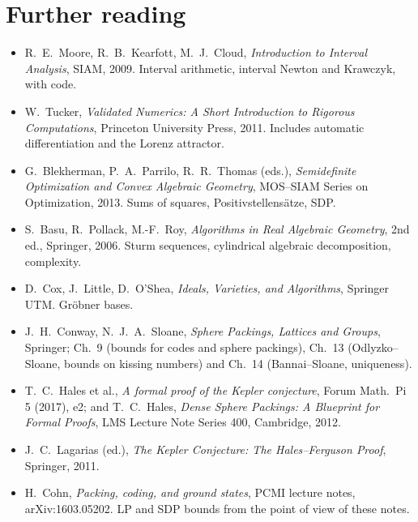 \documentclass[11pt,openany]{book}
\theoremstyle{plain}
\theoremstyle{definition}
\theoremstyle{remark}
\begin{document}
\section*{Further reading}
\begin{itemize}[nosep]
\item R.~E.~Moore, R.~B.~Kearfott, M.~J.~Cloud, \emph{Introduction to Interval Analysis}, SIAM, 2009. Interval
  arithmetic, interval Newton and Krawczyk, with code.
\item W.~Tucker, \emph{Validated Numerics: A Short Introduction to Rigorous Computations}, Princeton University
  Press, 2011. Includes automatic differentiation and the Lorenz attractor.
\item G.~Blekherman, P.~A.~Parrilo, R.~R.~Thomas (eds.), \emph{Semidefinite Optimization and Convex Algebraic
  Geometry}, MOS--SIAM Series on Optimization, 2013. Sums of squares, Positivstellens\"atze, SDP.
\item S.~Basu, R.~Pollack, M.-F.~Roy, \emph{Algorithms in Real Algebraic Geometry}, 2nd ed., Springer, 2006.
  Sturm sequences, cylindrical algebraic decomposition, complexity.
\item D.~Cox, J.~Little, D.~O'Shea, \emph{Ideals, Varieties, and Algorithms}, Springer UTM. Gr\"obner bases.
\item J.~H.~Conway, N.~J.~A.~Sloane, \emph{Sphere Packings, Lattices and Groups}, Springer; Ch.~9 (bounds for
  codes and sphere packings), Ch.~13 (Odlyzko--Sloane, bounds on kissing numbers) and Ch.~14 (Bannai--Sloane,
  uniqueness).
\item T.~C.~Hales et al., \emph{A formal proof of the Kepler conjecture}, Forum Math.\ Pi 5 (2017), e2; and
  T.~C.~Hales, \emph{Dense Sphere Packings: A Blueprint for Formal Proofs}, LMS Lecture Note Series 400, Cambridge,
  2012.
\item J.~C.~Lagarias (ed.), \emph{The Kepler Conjecture: The Hales--Ferguson Proof}, Springer, 2011.
\item H.~Cohn, \emph{Packing, coding, and ground states}, PCMI lecture notes, arXiv:1603.05202. LP and SDP bounds
  from the point of view of these notes.
\end{itemize}
\endgroup
\begingroup\renewcommand{\thechapter}{G}\renewcommand{\theHchapter}{interludeG}
\end{document}
